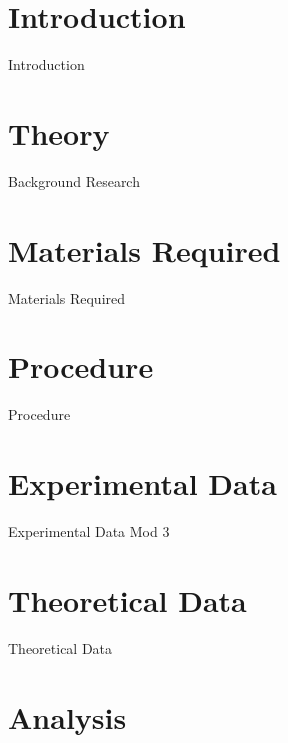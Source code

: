 \documentclass[12pt, a4paper]{report}
\begin{document}
\maketitle

\tableofcontents
\clearpage






\chapter{{Introduction}}
        
        {Introduction}  
        
\chapter{{Theory}}
        
        {Background Research}
        
\chapter{{Materials Required}}
        
        {Materials Required}
        
\chapter{{Procedure}}
        
        {Procedure}
        
\chapter{{Experimental Data}}
        
		{Experimental Data Mod 3}

\chapter{{Theoretical Data}}

		{Theoretical Data}
        
\chapter{{Analysis}}
\end{document}
